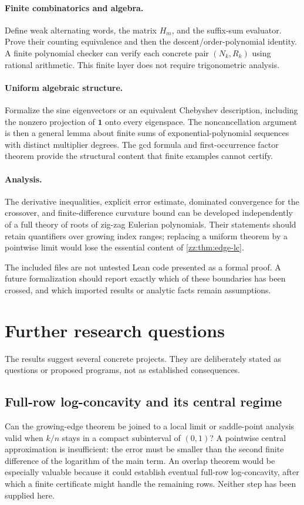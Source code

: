 \documentclass[11pt,a4paper]{article}
\theoremstyle{definition}
\newcommand{\one}{\mathbf{1}}
\begin{document}
\paragraph{Finite combinatorics and algebra.}
Define weak alternating words, the matrix $H_m$, and the suffix-sum evaluator.
Prove their counting equivalence and then the descent/order-polynomial
identity.  A finite polynomial checker can verify each concrete pair
$(N_k,R_k)$ using rational arithmetic.  This finite layer does not require
trigonometric analysis.
\paragraph{Uniform algebraic structure.}
Formalize the sine eigenvectors or an equivalent Chebyshev description,
including the nonzero projection of $\one$ onto every eigenspace.
The noncancellation argument is then a general lemma about finite sums of
exponential-polynomial sequences with distinct multiplier degrees.
The gcd formula and first-occurrence factor theorem provide the structural
content that finite examples cannot certify.
\paragraph{Analysis.}
The derivative inequalities, explicit error estimate, dominated convergence
for the crossover, and finite-difference curvature bound can be developed
independently of a full theory of roots of zig-zag Eulerian polynomials.
Their statements should retain quantifiers over growing index ranges;
replacing a uniform theorem by a pointwise limit would lose the essential
content of \cref{zz:thm:edge-lc}.

The included files are not untested Lean code presented as a formal proof.
A future formalization should report exactly which of these boundaries has
been crossed, and which imported results or analytic facts remain assumptions.

\section{Further research questions}
\label{zz:sec:questions}
The results suggest several concrete projects.  They are deliberately stated
as questions or proposed programs, not as established consequences.

\subsection{Full-row log-concavity and its central regime}
Can the growing-edge theorem be joined to a local limit or saddle-point
analysis valid when $k/n$ stays in a compact subinterval of $(0,1)$?
A pointwise central approximation is insufficient: the error must be smaller
than the second finite difference of the logarithm of the main term.
An overlap theorem would be especially valuable because it could establish
eventual full-row log-concavity, after which a finite certificate might handle
the remaining rows.  Neither step has been supplied here.
\end{document}

